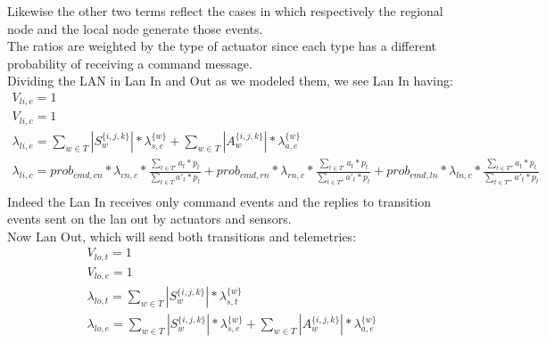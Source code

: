 \documentclass[11pt]{article}
\begin{document}
Likewise the other two terms reflect the cases in which respectively the regional node and the local node generate those events.\\
The ratios are weighted by the type of actuator since each type has a different probability of receiving a command message.\\
Dividing the LAN in Lan In and Out as we modeled them, we see Lan In having:
\begin{equation}
    \begin{array}{l}
        V_{li, e} = 1 \\ %
        V_{li,c} = 1 \\
        \lambda_{li, e} = \sum\limits_{w \in T}{| S^{\{i,j,k\}}_{w} | * \lambda^{\{w\}}_{s, e}} + \sum\limits_{w \in T}{| A^{\{i,j,k\}}_{w} | * \lambda^{\{w\}}_{a, e}}\\
		\lambda_{li, c} = prob_{cmd,cn} * \lambda_{cn, c} * \frac{\sum\limits_{t \in T'}{a_{t} * p_{t}}}{\sum\limits_{t \in T}{a'_{t} * p_{t}}} + prob_{cmd,rn} * \lambda_{rn, c} *\frac{\sum\limits_{t \in T'}{a_{t} * p_{t}}}{\sum\limits_{t \in T''}{a'_{t} * p_{t}}}  + prob_{cmd,ln} * \lambda_{ln, c} * \frac{\sum\limits_{t \in T''}{a_{t} * p_{t}}}{\sum\limits_{t \in T'''}{a'_{t} * p_{t}}}  \\\

    \end{array}
\end{equation}
Indeed the Lan In receives only command events and the replies to transition events sent on the lan out by actuators and sensors.\\
Now Lan Out, which will send both transitions and telemetries:
\begin{equation}
    \begin{array}{l}
        V_{lo, t} = 1 \\
        V_{lo, e} = 1 \\ %
        \lambda_{lo, t} = \sum\limits_{w \in T}{| S^{\{i,j,k\}}_{w} | * \lambda^{\{w\}}_{s, t}}  \\
        \lambda_{lo, e} = \sum\limits_{w \in T}{| S^{\{i,j,k\}}_{w} | * \lambda^{\{w\}}_{s, e}} + \sum\limits_{w \in T}{| A^{\{i,j,k\}}_{w} | * \lambda^{\{w\}}_{a, e}}\\


    \end{array}
\end{equation}
\end{document}
